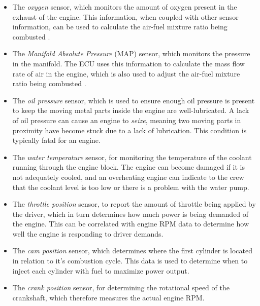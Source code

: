 \begin{itemize}

\item The \emph{oxygen} sensor, which monitors the amount of oxygen present in the exhaust of the engine. This information, when coupled with other sensor information, can be used to calculate the air-fuel mixture ratio being combusted \cite{o2sensor}.

\item The \emph{Manifold Absolute Pressure} (MAP) sensor, which monitors the pressure in the manifold. The ECU uses this information to calculate the mass flow rate of air in the engine, which is also used to adjust the air-fuel mixture ratio being combusted \cite{mapsensor}.

\item The \emph{oil pressure} sensor, which is used to ensure enough oil pressure is present to keep the moving metal parts inside the engine are well-lubricated. A lack of oil pressure can cause an engine to \emph{seize}, meaning two moving parts in proximity have become stuck due to a lack of lubrication. This condition is typically fatal for an engine.

\item The \emph{water temperature} sensor, for monitoring the temperature of the coolant running through the engine block. The engine can become damaged if it is not adequately cooled, and an overheating engine can indicate to the crew that the coolant level is too low or there is a problem with the water pump.

\item The \emph{throttle position} sensor, to report the amount of throttle being applied by the driver, which in turn determines how much power is being demanded of the engine. This can be correlated with engine RPM data to determine how well the engine is responding to driver demands.

\item The \emph{cam position} sensor, which determines where the first cylinder is located in relation to it's combustion cycle. This data is used to determine when to inject each cylinder with fuel to maximize power output.

\item The \emph{crank position} sensor, for determining the rotational speed of the crankshaft, which therefore measures the actual engine RPM. 

\end{itemize}

